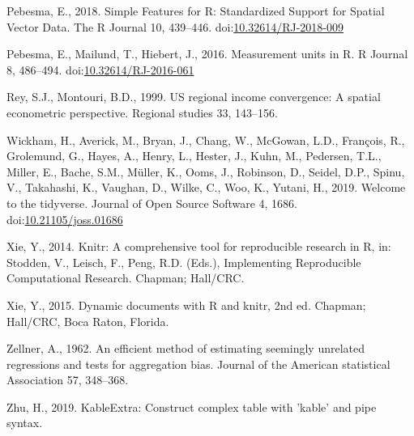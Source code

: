 \documentclass[]{elsarticle} %
\begin{document}
\leavevmode\hypertarget{ref-Pebesma2018}{}%
Pebesma, E., 2018. Simple Features for R: Standardized Support for
Spatial Vector Data. The R Journal 10, 439--446.
doi:\href{https://doi.org/10.32614/RJ-2018-009}{10.32614/RJ-2018-009}

\leavevmode\hypertarget{ref-Pebesma2016}{}%
Pebesma, E., Mailund, T., Hiebert, J., 2016. Measurement units in R. R
Journal 8, 486--494.
doi:\href{https://doi.org/10.32614/RJ-2016-061}{10.32614/RJ-2016-061}

\leavevmode\hypertarget{ref-Rey1999us}{}%
Rey, S.J., Montouri, B.D., 1999. US regional income convergence: A
spatial econometric perspective. Regional studies 33, 143--156.

\leavevmode\hypertarget{ref-Wickham2019}{}%
Wickham, H., Averick, M., Bryan, J., Chang, W., McGowan, L.D., François,
R., Grolemund, G., Hayes, A., Henry, L., Hester, J., Kuhn, M., Pedersen,
T.L., Miller, E., Bache, S.M., Müller, K., Ooms, J., Robinson, D.,
Seidel, D.P., Spinu, V., Takahashi, K., Vaughan, D., Wilke, C., Woo, K.,
Yutani, H., 2019. Welcome to the tidyverse. Journal of Open Source
Software 4, 1686.
doi:\href{https://doi.org/10.21105/joss.01686}{10.21105/joss.01686}

\leavevmode\hypertarget{ref-Xie2014}{}%
Xie, Y., 2014. Knitr: A comprehensive tool for reproducible research in
R, in: Stodden, V., Leisch, F., Peng, R.D. (Eds.), Implementing
Reproducible Computational Research. Chapman; Hall/CRC.

\leavevmode\hypertarget{ref-Xie2015}{}%
Xie, Y., 2015. Dynamic documents with R and knitr, 2nd ed. Chapman;
Hall/CRC, Boca Raton, Florida.

\leavevmode\hypertarget{ref-Zellner1962efficient}{}%
Zellner, A., 1962. An efficient method of estimating seemingly unrelated
regressions and tests for aggregation bias. Journal of the American
statistical Association 57, 348--368.

\leavevmode\hypertarget{ref-Zhu2019}{}%
Zhu, H., 2019. KableExtra: Construct complex table with 'kable' and pipe
syntax.
\end{document}
